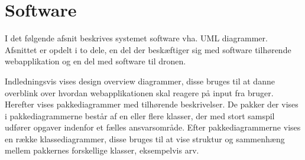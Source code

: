\chapter{Software}

I det følgende afsnit beskrives systemet software vha. UML diagrammer. Afsnittet er opdelt i to dele, en del der beskæftiger sig med software tilhørende webapplikation og en del med software til dronen. 

Indledningsvis vises design overview diagrammer, disse bruges til at danne overblink over hvordan webapplikationen skal reagere på input fra bruger. Herefter vises pakkediagrammer med tilhørende beskrivelser. De pakker der vises i pakkediagrammerne består af en eller flere klasser, der med stort samspil udfører opgaver indenfor et fælles ansvarsområde. Efter pakkediagrammerne vises en række klassediagrammer, disse bruges til at vise struktur og sammenhæng mellem pakkernes forskellige klasser, eksempelvis arv.

\newpage


\newpage


\newpage
